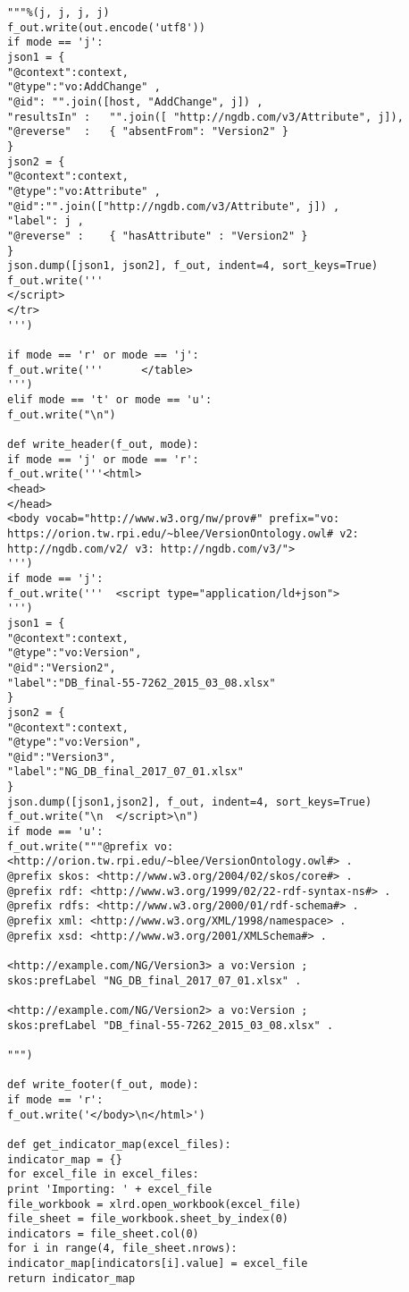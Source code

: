\begin{verbatim}
"""%(j, j, j, j)
f_out.write(out.encode('utf8'))
if mode == 'j':
json1 = {
"@context":context,
"@type":"vo:AddChange" ,
"@id": "".join([host, "AddChange", j]) ,
"resultsIn" :   "".join([ "http://ngdb.com/v3/Attribute", j]),
"@reverse"  :   { "absentFrom": "Version2" }
}
json2 = {
"@context":context,
"@type":"vo:Attribute" ,
"@id":"".join(["http://ngdb.com/v3/Attribute", j]) ,
"label": j ,
"@reverse" :    { "hasAttribute" : "Version2" }
}
json.dump([json1, json2], f_out, indent=4, sort_keys=True)
f_out.write('''
</script>
</tr>
''')

if mode == 'r' or mode == 'j':
f_out.write('''      </table>
''')
elif mode == 't' or mode == 'u':
f_out.write("\n")

def write_header(f_out, mode):
if mode == 'j' or mode == 'r':
f_out.write('''<html>
<head>
</head>
<body vocab="http://www.w3.org/nw/prov#" prefix="vo: https://orion.tw.rpi.edu/~blee/VersionOntology.owl# v2: http://ngdb.com/v2/ v3: http://ngdb.com/v3/">
''')
if mode == 'j':
f_out.write('''  <script type="application/ld+json">
''')
json1 = {
"@context":context,
"@type":"vo:Version",
"@id":"Version2",
"label":"DB_final-55-7262_2015_03_08.xlsx"
}
json2 = {
"@context":context,
"@type":"vo:Version",
"@id":"Version3",
"label":"NG_DB_final_2017_07_01.xlsx"
}
json.dump([json1,json2], f_out, indent=4, sort_keys=True)
f_out.write("\n  </script>\n")
if mode == 'u':
f_out.write("""@prefix vo: <http://orion.tw.rpi.edu/~blee/VersionOntology.owl#> .
@prefix skos: <http://www.w3.org/2004/02/skos/core#> .
@prefix rdf: <http://www.w3.org/1999/02/22-rdf-syntax-ns#> .
@prefix rdfs: <http://www.w3.org/2000/01/rdf-schema#> .
@prefix xml: <http://www.w3.org/XML/1998/namespace> .
@prefix xsd: <http://www.w3.org/2001/XMLSchema#> .

<http://example.com/NG/Version3> a vo:Version ;
skos:prefLabel "NG_DB_final_2017_07_01.xlsx" .

<http://example.com/NG/Version2> a vo:Version ;
skos:prefLabel "DB_final-55-7262_2015_03_08.xlsx" .

""")

def write_footer(f_out, mode):
if mode == 'r':
f_out.write('</body>\n</html>')

def get_indicator_map(excel_files):
indicator_map = {}
for excel_file in excel_files:
print 'Importing: ' + excel_file
file_workbook = xlrd.open_workbook(excel_file)
file_sheet = file_workbook.sheet_by_index(0)
indicators = file_sheet.col(0)
for i in range(4, file_sheet.nrows):
indicator_map[indicators[i].value] = excel_file
return indicator_map


\end{verbatim}

